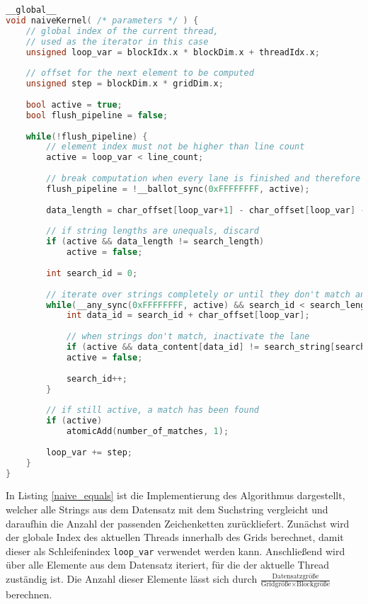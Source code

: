 \begin{lstlisting}[language=C++,
	caption=Naive Implementierung des String-Vergleichs,
	label=naive_equals]
__global__
void naiveKernel( /* parameters */ ) {
	// global index of the current thread,
	// used as the iterator in this case
	unsigned loop_var = blockIdx.x * blockDim.x + threadIdx.x;
	
	// offset for the next element to be computed
	unsigned step = blockDim.x * gridDim.x;
	
	bool active = true;
	bool flush_pipeline = false;
	
	while(!flush_pipeline) {
		// element index must not be higher than line count
		active = loop_var < line_count;
		
		// break computation when every lane is finished and therefore inactive
		flush_pipeline = !__ballot_sync(0xFFFFFFFF, active);
		
		data_length = char_offset[loop_var+1] - char_offset[loop_var] - 1;
		
		// if string lengths are unequals, discard
		if (active && data_length != search_length)
			active = false;
		
		int search_id = 0;
		
		// iterate over strings completely or until they don't match anymore
		while(__any_sync(0xFFFFFFFF, active) && search_id < search_length) {
			int data_id = search_id + char_offset[loop_var];
			
			// when strings don't match, inactivate the lane
			if (active && data_content[data_id] != search_string[search_id])
			active = false;
			
			search_id++;
		}
		
		// if still active, a match has been found
		if (active)
			atomicAdd(number_of_matches, 1);
		
		loop_var += step;
	}
}
\end{lstlisting}

In Listing \ref{naive_equals} ist die Implementierung des Algorithmus dargestellt, welcher alle Strings aus dem Datensatz mit dem Suchstring vergleicht und daraufhin die Anzahl der passenden Zeichenketten zurückliefert.
Zunächst wird der globale Index des aktuellen Threads innerhalb des Grids berechnet, damit dieser als Schleifenindex \texttt{loop\_var} verwendet werden kann.
Anschließend wird über alle Elemente aus dem Datensatz iteriert, für die der aktuelle Thread zuständig ist.
Die Anzahl dieser Elemente lässt sich durch $\frac{\text{Datensatzgröße}}{\text{Gridgröße} \times \text{Blockgröße}}$ berechnen.

